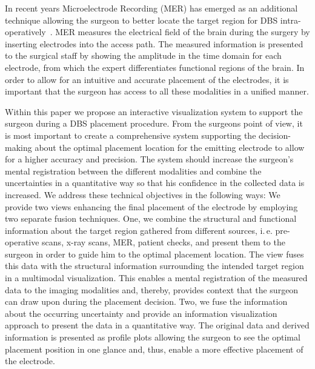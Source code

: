 \documentclass[review]{vgtc}                 %
\begin{document}
In recent years Microelectrode Recording (MER) has emerged as an additional technique allowing the surgeon to better locate the target region for DBS intra-operatively~\cite{Lenz1988}. MER measures the electrical field of the brain during the surgery by inserting electrodes into the access path. The measured information is presented to the surgical staff by showing the amplitude in the time domain for each electrode, from which the expert differentiates functional regions of the brain. In order to allow for an intuitive and accurate placement of the electrodes, it is important that the surgeon has access to all these modalities in a unified manner.

Within this paper we propose an interactive visualization system to support the surgeon during a DBS placement procedure. From the surgeons point of view, it is most important to create a comprehensive system supporting the decision-making about the optimal placement location for the emitting electrode to allow for a higher accuracy and precision. The system should increase the surgeon's mental registration between the different modalities and combine the uncertainties in a quantitative way so that his confidence in the collected data is increased.%
%
We address these technical objectives in the following ways: We provide two views enhancing the final placement of the electrode by employing two separate fusion techniques. One, we combine the structural and functional information about the target region gathered from different sources, i.\,e. pre-operative scans, x-ray scans, MER, patient checks, and present them to the surgeon in order to guide him to the optimal placement location. The view fuses this data with the structural information surrounding the intended target region in a multimodal visualization. This enables a mental registration of the measured data to the imaging modalities and, thereby, provides context that the surgeon can draw upon during the placement decision. Two, we fuse the information about the occurring uncertainty and provide an information visualization approach to present the data in a quantitative way. The original data and derived information is presented as profile plots allowing the surgeon to see the optimal placement position in one glance and, thus, enable a more effective placement of the electrode.
\end{document}
